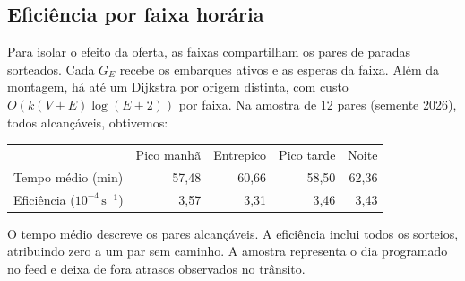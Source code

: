\subsection{Eficiência por faixa horária}\label{sec:F-EFI-OPC}
Para isolar o efeito da oferta, as faixas compartilham os pares de paradas
sorteados. Cada $G_E$ recebe os embarques ativos e as esperas da faixa.
Além da montagem, há até um Dijkstra por origem distinta, com custo
$O(k(V+E)\log(E+2))$ por faixa. Na amostra de 12 pares (semente 2026),
todos alcançáveis, obtivemos:
\begin{center}\small
\begin{tabular}{lrrrr}
 & Pico manhã & Entrepico & Pico tarde & Noite\\
Tempo médio (min) & 57,48 & 60,66 & 58,50 & 62,36\\
Eficiência ($10^{-4}\,\mathrm{s}^{-1}$) & 3,57 & 3,31 & 3,46 & 3,43
\end{tabular}
\end{center}
O tempo médio descreve os pares alcançáveis. A eficiência inclui todos os
sorteios, atribuindo zero a um par sem caminho. A amostra representa o dia
programado no feed e deixa de fora atrasos observados no trânsito.
